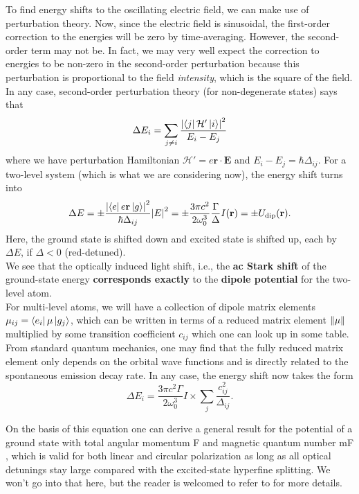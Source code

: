 \documentclass{book}
\theoremstyle{definition}
\newcommand{\ham}{\mathcal{H}}
\newcommand{\f}[2]{\frac{#1}{#2}}
\begin{document}
\begin{framed}
	 \noindent To find energy shifts to the oscillating electric field, we can make use of perturbation theory. Now, since the electric field is sinusoidal, the first-order correction to the energies will be zero by time-averaging. However, the second-order term may not be. In fact, we may very well expect the correction to energies to be non-zero in the second-order perturbation because this perturbation is proportional to the field \textit{intensity}, which is the square of the field. In any case, second-order perturbation theory (for non-degenerate states) says that
	 \begin{equation*}
	 \Delta E_i = \sum_{j\neq i} \f{\abs{\bra{j} \ham'\ket{i}}^2}{E_i - E_j}
	 \end{equation*} 
	 where we have perturbation Hamiltonian $\ham' = e \mathbf{r}\cdot \mathbf{E} $ and $E_i - E_j = \hbar \Delta_{ij}$. For a two-level system (which is what we are considering now), the energy shift turns into
	 \begin{equation*}
	 \Delta E = \pm \f{\abs{\bra{e} e\mathbf{r} \ket{g}}^2}{\hbar \Delta_{ij}} \abs{E}^2 = \pm \f{3\pi c^2}{2\omega_0^3} \f{\Gamma}{\Delta}I(\mathbf{r}) = \pm U_\text{dip}(\mathbf{r}).  
	 \end{equation*}
	 Here, the ground state is shifted down and excited state is shifted up, each by $\Delta E$, if $\Delta < 0$ (red-detuned).  \\
	 
	 We see that the optically induced light shift, i.e., the \textbf{ac Stark shift} of the ground-state energy \textbf{corresponds exactly} to the \textbf{dipole potential} for the two-level atom. \\
	 
	 
	 
	 For multi-level atoms, we will have a collection of dipole matrix elements $\mu_{ij} = \bra{e_i}\mu\ket{g_j}$, which can be written in terms of a reduced matrix element $\norm{\mu}$ multiplied by some transition coefficient $c_{ij}$ which one can look up in some table. From standard quantum mechanics, one may find that the fully reduced matrix element only depends on the orbital wave functions and is directly related to the spontaneous emission decay rate. In any case, the energy shift now takes the form
	 \begin{equation*}
	 \Delta E_i = \f{3\pi c^2 \Gamma}{2\omega_0^3} I \times \sum_j \f{c_{ij}^2}{\Delta_{ij}}.
	 \end{equation*}
	 
	 
	 On the basis of this equation  one can derive a general result for the potential of a ground state with total angular momentum F and magnetic quantum number mF , which is valid for both linear and circular polarization as long as all optical detunings stay large compared with the
	 excited-state hyperfine splitting. We won't go into that here, but the reader is welcomed to refer to \cite{grimm2000optical} for more details. 
\end{framed}
\end{document}
